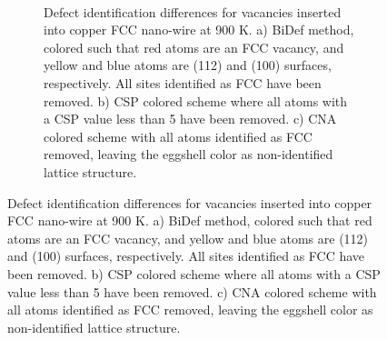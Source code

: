 \documentclass[12pt]{iopart}
\begin{document}
\begin{figure}[htbp]
\begin{figure}
\begin{center}
 \\
\caption{Defect identification differences for vacancies inserted into copper FCC nano-wire at 900 K. a) BiDef method, colored such that red atoms are an FCC vacancy, and yellow and blue atoms are (112) and (100) surfaces, respectively. All sites identified as FCC have been removed. b) CSP colored scheme where all atoms with a CSP value less than 5 have been removed. c) CNA colored scheme with all atoms identified as FCC removed, leaving the eggshell color as non-identified lattice structure.}
\label{fig:vacancy_structures}
\end{center}
\end{figure}


\end{figure}
\end{document}
